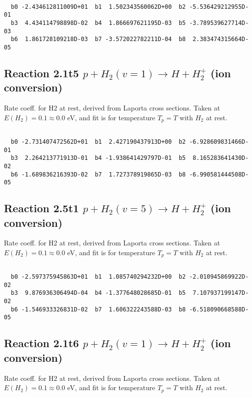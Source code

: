 \begin{small}\begin{verbatim}

  b0 -2.434612811009D+01  b1  1.502343560062D+00  b2 -5.536429212955D-01
  b3  4.434114798898D-02  b4  1.866697621195D-03  b5 -3.789539627714D-03
  b6  1.861728109218D-03  b7 -3.572022782211D-04  b8  2.383474315664D-05

\end{verbatim}\end{small}

\newpage
\subsection{
Reaction 2.1t5
$ p + H_2(v=1) \rightarrow H + H_2^+$ (ion conversion)
}
Rate coeff. for H2 at rest, derived from Laporta cross sections.
Taken at $E(H_2) = 0.1 \approx 0.0$ eV,  and fit is for temperature $T_p=T$ with $H_2$ at rest.

\begin{small}\begin{verbatim}

  b0 -2.731407472562D+01  b1  2.427190437913D+00  b2 -6.928609831466D-01
  b3  2.264213771913D-01  b4 -1.938641429797D-01  b5  8.165283641430D-02
  b6 -1.689836216393D-02  b7  1.727378919865D-03  b8 -6.990581444508D-05

\end{verbatim}\end{small}

\newpage
\subsection{
Reaction 2.5t1
$ p + H_2(v=5) \rightarrow H + H_2^+$ (ion conversion)
}
Rate coeff. for H2 at rest, derived from Laporta cross sections.
Taken at $E(H_2) = 0.1 \approx 0.0$ eV,  and fit is for temperature $T_p=T$ with $H_2$ at rest.

\begin{small}\begin{verbatim}

  b0 -2.597375945863D+01  b1  1.085740294232D+00  b2 -2.010945869922D-02
  b3  9.876936306494D-04  b4 -1.377648028685D-01  b5  7.107937199147D-02
  b6 -1.546933326831D-02  b7  1.606322243588D-03  b8 -6.518090668588D-05

\end{verbatim}\end{small}

\newpage
\subsection{
Reaction 2.1t6
$ p + H_2(v=1) \rightarrow H + H_2^+$ (ion conversion)
}
Rate coeff. for H2 at rest, derived from Laporta cross sections.
Taken at $E(H_2) = 0.1 \approx 0.0$ eV,  and fit is for temperature $T_p=T$ with $H_2$ at rest.

